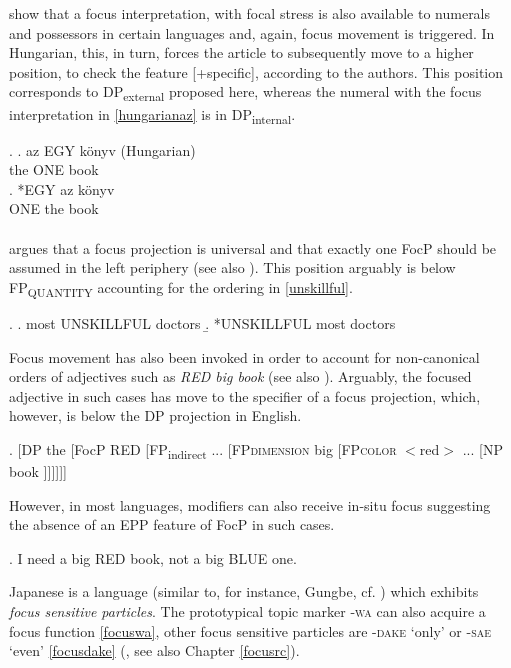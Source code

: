 \documentclass [output=book,colorlinks,citecolor=brown]{langscibook}
\begin{document}
\citet{ihsane:2001:specific} show that a focus interpretation, with focal stress is also available to numerals and possessors in certain languages and, again, focus movement is triggered. In Hungarian, this, in turn, forces the article to subsequently move to a higher position, to check the feature [+specific], according to the authors. This position corresponds to DP\textsubscript{external} proposed here, whereas the numeral with the focus interpretation in \ref{hungarianaz} is in DP\textsubscript{internal}. %

\ex. \label{hungarianaz} \ag. az EGY könyv (Hungarian)\\
the ONE book \\
\bg. *EGY az könyv\\
ONE the book \\ \null \hfill \citep[48]{ihsane:2001:specific}\\

\citet[ch. 6.7]{kim:2019:syntax} argues that a focus projection is universal and that exactly one FocP should be assumed in the left periphery (see also \citet{giusti:2016:latin, roehrs:2019:left}). This position arguably is below FP\textsubscript{QUANTITY} accounting for the ordering in \ref{unskillful}.

\ex. \label{unskillful} \a. most UNSKILLFUL doctors \null \hfill \citep[137]{kim:2019:syntax}
\b. *UNSKILLFUL most doctors

Focus movement has also been invoked in order to account for non-canonical orders of adjectives such as \textit{RED big book} (see also \citealt{svenonius:2008:position}). Arguably, the focused adjective in such cases has move to the specifier of a focus projection, which, however, is below the DP projection in English. %

\exi. [DP the [FocP RED [FP\textsubscript{indirect} ... [FP\textsc{dimension} big [FP\textsc{color} $<$red$>$ ... [NP book ]]]]]] %

However, in most languages, modifiers can also receive in-situ focus \citep[191]{kim:2019:syntax} suggesting the absence of an EPP feature of FocP in such cases.

\ex. I need a big RED book, not a big BLUE one.

Japanese is a language (similar to, for instance, Gungbe, cf. \citealt{aboh:2004:topic}) which exhibits \textit{focus sensitive particles}. The prototypical topic marker -\textsc{wa} can also acquire a focus function \ref{focuswa}, other focus sensitive particles are -\textsc{dake} `only' or -\textsc{sae} `even’ \ref{focusdake} (\citealt{tomioka:2009:contrastive, tomioka:2016:infor, vermeulen:2007:jap, vermeulen:2012:info}, see also Chapter \ref{focusrc}).
\end{document}
